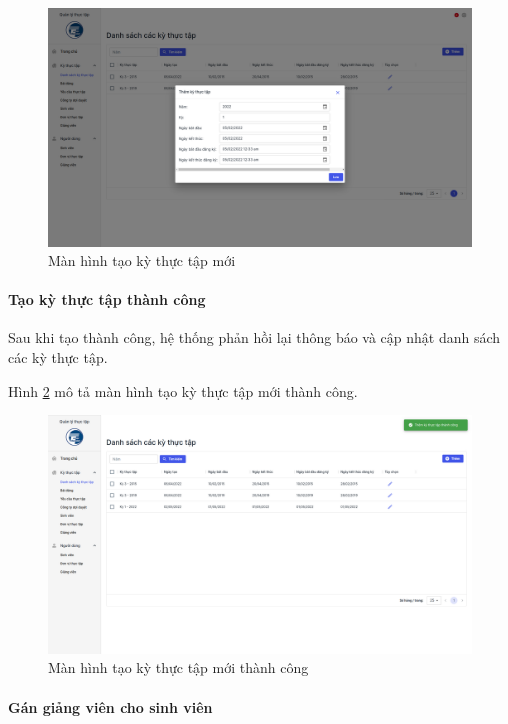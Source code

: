 \documentclass[./../main.tex]{subfiles}
\begin{document}
\begin{figure}[]
	\includegraphics[width=\linewidth]{./images/image19.png}
	\caption{Màn hình tạo kỳ thực tập mới}
	\label{fig:add_term_page}
\end{figure}

\paragraph*{Tạo kỳ thực tập thành công}

Sau khi tạo thành công, hệ thống phản hồi lại thông báo và cập nhật danh sách các kỳ thực tập.

Hình \ref{fig:add_term_success} mô tả màn hình tạo kỳ thực tập mới thành công.

\begin{figure}[]
	\includegraphics[width=\linewidth]{./images/image20.png}
	\caption{Màn hình tạo kỳ thực tập mới thành công}
	\label{fig:add_term_success}
\end{figure}

\paragraph*{Gán giảng viên cho sinh viên}
\end{document}
